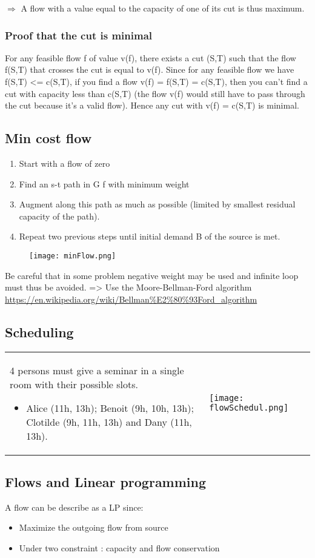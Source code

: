 $\Rightarrow$ A flow with a value equal to the capacity of one of its cut is thus
maximum.

\subsubsection{Proof that the cut is minimal}
For any feasible flow f of value v(f), there exists a cut (S,T) such
that the flow f(S,T) that crosses the cut is equal to v(f). Since for
any feasible flow we have f(S,T) <= c(S,T), if you find a flow v(f) =
f(S,T) = c(S,T), then you can't find a cut with capacity less than
c(S,T) (the flow v(f) would still have to pass through the cut because
it's a valid flow). Hence any cut with v(f) = c(S,T) is minimal.

\subsection{Min cost flow}
\begin{enumerate}
    \item Start with a flow of zero
    \item  Find an s-t path in G f with minimum weight
    \item  Augment along this path as much as possible (limited by
        smallest
        residual capacity of the path).
    \item  Repeat two previous steps until initial demand B of the source
        is met.
\end{enumerate}

\begin{figure}[!ht]
    \centering
    \texttt{[image: minFlow.png]}
\end{figure}

Be careful that in some problem negative weight may be used and infinite
loop must thus be avoided. => Use the Moore-Bellman-Ford algorithm
\url{https://en.wikipedia.org/wiki/Bellman%E2%80%93Ford_algorithm} 



\subsection{Scheduling}

\begin{tabular}{m{8cm}m{7cm}}
4 persons must give a seminar in a
single room with their possible slots.
\begin{itemize}
    \item  Alice (11h, 13h); Benoit (9h, 10h, 13h);
        Clotilde (9h, 11h, 13h) and Dany (11h, 13h).
\end{itemize}
&
\texttt{[image: flowSchedul.png]}
\end{tabular}


\subsection{Flows and Linear programming}
A flow can be describe as a LP since:
\begin{itemize}
    \item Maximize the outgoing flow from source
    \item Under two constraint : capacity and flow conservation
\end{itemize}


